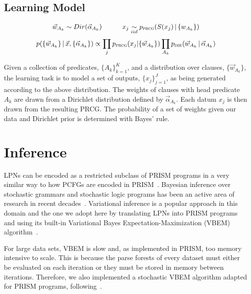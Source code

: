 \documentclass{article} %
\begin{document}
\subsection{Learning Model}
\[ \vec{w}_{A_k} \sim Dir(\vec{\alpha}_{A_k})\hspace{3em}
   x_j \underset{iid}{\sim} p_{\text{\textsc{prcg}}}(S(x_j)\,|\,\{w_{A_k}\}) \]
\[  p(\{\vec{w}_{A_k}\}\,|\, \vec{x}, \{\vec{\alpha}_{A_k}\}) \propto
  \prod_j p_{\text{\textsc{prcg}}}(x_j|\{\vec{w}_{A_k}\}) \prod_{A_k}
  p_{\text{\textsc{dir}}}(\vec{w}_{A_k}\,|\,\vec{\alpha}_{A_k}) \]

  \vspace{-1em} Given a collection of predicates, $\{A_k\}_{k=1}^{K}$,
  and a distribution over clauses, $\{\vec{w}_{A_k}\}$, the learning
  task is to model a set of outputs, $\{x_j\}_{j=1}^{J}$, as being
  generated according to the above distribution. The weights of
  clauses with head predicate $A_k$ are drawn from a Dirichlet
  distribution defined by $\vec{\alpha}_{A_k}$. Each datum $x_j$ is
  then drawn from the resulting PRCG. The probability of a set of
  weights given our data and Dirichlet prior is determined with Bayes'
  rule.

\section{Inference \label{sec:implementation}}

LPNs can be encoded as a restricted subclass of PRISM programs in a
very similar way to how PCFGs are encoded in
PRISM~\cite{DBLP:conf/cl/2000}. Bayesian inference over stochastic
grammars and stochastic logic programs has been an active area of
research in recent decades~\cite{DBLP:journals/etai/Muggleton00,
  cussens2001parameter, DBLP:conf/emnlp/LiangPJK07,
  goldwater2006contextual, johnson2006adaptor}.  Variational inference
is a popular approach in this domain and the one we adopt here by
translating LPNs into PRISM programs and using its built-in
Variational Bayes Expectation-Maximization (VBEM)
algorithm~\cite{sato2008variational}.

For large data sets, VBEM is slow and, as implemented in PRISM,
too memory intensive to scale. This is because the parse forests of
every dataset must either be evaluated on each iteration or they must
be stored in memory between iterations.  Therefore, we also
implemented a stochastic VBEM algorithm adapted for PRISM programs,
following~\cite{ranganath2013adaptive,
  DBLP:journals/jmlr/HoffmanBWP13}.
\end{document}
